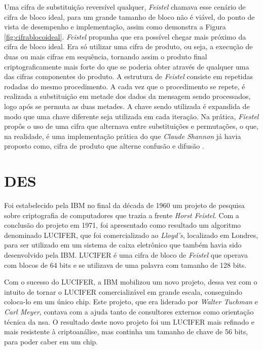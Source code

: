 Uma cifra de substituição reversível qualquer, \textit{Feistel} chamava esse cenário de cifra de bloco ideal, para um grande tamanho de bloco não é viável, do ponto de vista de desempenho e implementação, assim como demonstra a Figura \ref{fig:cifrablocoideal}. \textit{Feistel} propunha que era possível chegar mais próximo da cifra de bloco ideal. Era só utilizar uma cifra de produto, ou seja, a execução de duas ou mais cifras em sequência, tornando assim o produto final criptograficamente mais forte do que se poderia obter através de qualquer uma das cifras componentes do produto. A estrutura de \textit{Feistel} consiste em repetidas rodadas do mesmo procedimento. A cada vez que o procedimento se repete, é realizada a substituição em metade dos dados da mensagem sendo processados, logo após se permuta as duas metades. A chave sendo utilizada é expandida de modo que uma chave diferente seja utilizada em cada iteração. Na prática, \textit{Fiestel} propôs o uso de uma cifra que alternava entre substituições e permutações, o que, na realidade, é uma implementação prática do que \textit{Claude Shannon} já havia proposto como, cifra de produto que alterne confusão e difusão \cite{stallings14} \cite{tanenbaum03}.

\section{DES}
\label{sec:des}
Foi estabelecido pela IBM no final da década de 1960 um projeto de pesquisa sobre criptografia de computadores que trazia a frente \textit{Horst Feistel}. Com a conclusão do projeto em 1971, foi apresentado como resultado um algoritmo denominado LUCIFER, que foi comercializado ao \textit{Lloyd’s}, localizado em Londres, para ser utilizado em um sistema de caixa eletrônico que também havia sido desenvolvido pela IBM. LUCIFER é uma cifra de bloco de \textit{Feistel} que operava com blocos de 64 bits e se utilizava de uma palavra com tamanho de 128 bits.

Com o sucesso do LUCIFER, a IBM mobilizou um novo projeto, dessa vez com o intuito de tornar o LUCIFER comercializável em grande escala, conseguindo coloca-lo em um único chip. Este projeto, que era liderado por \textit{Walter Tuchman} e \textit{Carl Meyer}, contava com a ajuda tanto de consultores externos como orientação técnica da \acrfull{nsa}. O resultado deste novo projeto foi um LUCIFER mais refinado e mais resistente à criptoanálise, mas continha um tamanho de chave de 56 bits, para poder caber em um chip.

